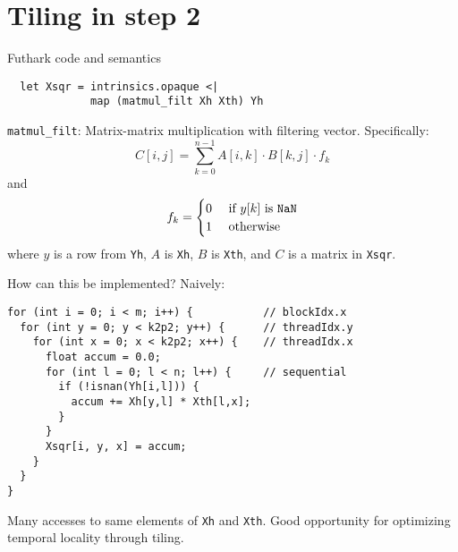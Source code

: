 

\section{Tiling in step 2}

\begin{frame}[fragile]{Futhark code and semantics}
\begin{verbatim}
  let Xsqr = intrinsics.opaque <|
             map (matmul_filt Xh Xth) Yh
\end{verbatim}
\texttt{matmul\_filt}: Matrix-matrix multiplication with filtering vector.
Specifically:
\[
  C[i,j]=\sum\limits_{k=0}^{n-1} A[i,k]\cdot B[k,j]\cdot f_k
\]
and
\[
  f_k =
  \begin{cases}
    0 & \mbox{ if } y[k] \mbox{ is \texttt{NaN}} \\
    1 & \mbox{ otherwise }
  \end{cases}
\]
where \(y\) is a row from \texttt{Yh}, \(A\) is \texttt{Xh}, \(B\) is
\texttt{Xth}, and \(C\) is a matrix in \texttt{Xsqr}.
\end{frame}

\begin{frame}[fragile]{How can this be implemented?}
  Naively:
\begin{verbatim}
for (int i = 0; i < m; i++) {           // blockIdx.x
  for (int y = 0; y < k2p2; y++) {      // threadIdx.y
    for (int x = 0; x < k2p2; x++) {    // threadIdx.x
      float accum = 0.0;
      for (int l = 0; l < n; l++) {     // sequential
        if (!isnan(Yh[i,l])) {
          accum += Xh[y,l] * Xth[l,x];
        }
      }
      Xsqr[i, y, x] = accum;
    }
  }
}
\end{verbatim}
Many accesses to same elements of \texttt{Xh} and \texttt{Xth}.
Good opportunity for optimizing temporal locality through tiling.
\end{frame}

